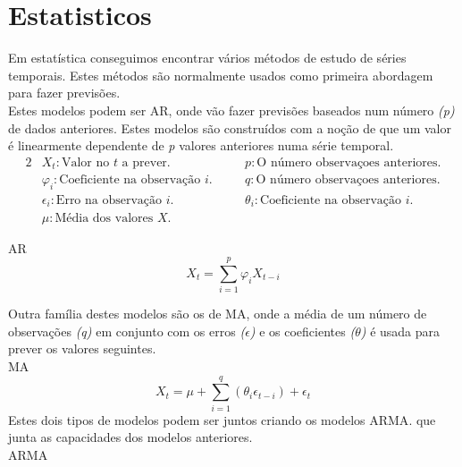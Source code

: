 \section{Estatisticos}

Em estatística conseguimos encontrar vários métodos de estudo de séries temporais. Estes métodos são normalmente usados como primeira abordagem para fazer previsões.\\
Estes modelos podem ser \gls{AR}, onde vão fazer previsões baseados num número \textit{(p)} de dados anteriores. Estes modelos são construídos com a noção de que um valor é linearmente dependente de \textit{p} valores anteriores numa série temporal.\\

\begin{alignat*}{2} 
    & X_{t} : \text{Valor no } t \text{ a prever.} &\quad& p : \text{O número observaçoes anteriores.} \\
    & \varphi_{i} : \text{Coeficiente na observação } i. &\quad& q : \text{O número observaçoes anteriores.} \\
    & \epsilon_{i} : \text{Erro na observação } i. &\quad& \theta_{i} : \text{Coeficiente na observação } i \text{.} \\ 
    & \mu : \text{Média dos valores } X \text{.} 
\end{alignat*}

\bigskip
\gls{AR} \\

\begin{equation} \label{eq:ar} 
    X_{t} = \sum_{i=1}^{p}\varphi_{i} X_{t-i} 
\end{equation}
\smallskip

Outra família destes modelos são os de \gls{MA}, onde a média de um número de observações \textit{(q)} em conjunto com os erros \textit{($\epsilon$)} e os coeficientes \textit{($\theta$)} é usada para prever os valores seguintes.\\
\bigskip
\gls{MA} \\

\begin{equation} \label{eq:ma} 
    X_{t} = \mu + \sum_{i=1}^{q}(\theta_{i} \epsilon_{t-i}) + \epsilon_{t}
\end{equation}
\smallskip
Estes dois tipos de modelos podem ser juntos criando os modelos \gls{ARMA}. que junta as capacidades dos modelos anteriores.\\

\bigskip
\gls{ARMA} \\

